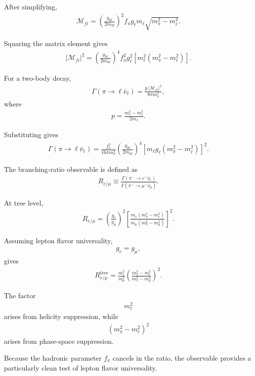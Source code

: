 After simplifying,
\begin{align}
\mathcal{M}_{fi}
=
\left(
\frac{g_W}{2m_W}
\right)^2
f_\pi g_\ell
m_\ell
\sqrt{m_\pi^2-m_\ell^2}.
\end{align}

Squaring the matrix element gives
\begin{align}
|\mathcal{M}_{fi}|^2
=
\left(
\frac{g_W}{2m_W}
\right)^4
f_\pi^2 g_\ell^2
\left[
m_\ell^2
(m_\pi^2-m_\ell^2)
\right].
\end{align}

For a two-body decay,
\begin{align}
\Gamma(\pi \to \ell \bar{\nu}_\ell)
=
\frac{
p\,|\mathcal{M}_{fi}|^2
}{
8\pi m_\pi^2
},
\end{align}
where
\begin{align}
p
=
\frac{
m_\pi^2-m_\ell^2
}{
2m_\pi
}.
\end{align}

Substituting gives
\begin{align}
\Gamma(\pi \to \ell \bar{\nu}_\ell)
=
\frac{f_\pi^2}{16\pi m_\pi^3}
\left(
\frac{g_W}{2m_W}
\right)^4
\left[
m_\ell g_\ell
(m_\pi^2-m_\ell^2)
\right]^2 .
\end{align}

The branching-ratio observable is defined as
\begin{align}
R_{e/\mu}
\equiv
\frac{
\Gamma(\pi^- \to e^- \bar{\nu}_e)
}{
\Gamma(\pi^- \to \mu^- \bar{\nu}_\mu)
}.
\end{align}

At tree level,
\begin{align}
R_{e/\mu}
=
\left(
\frac{g_e}{g_\mu}
\right)^2
\left[
\frac{
m_e(m_\pi^2-m_e^2)
}{
m_\mu(m_\pi^2-m_\mu^2)
}
\right]^2 .
\end{align}

Assuming lepton flavor universality,
\begin{align}
g_e = g_\mu ,
\end{align}
gives
\begin{align}
R_{e/\mu}^{\mathrm{tree}}
=
\frac{m_e^2}{m_\mu^2}
\left(
\frac{
m_\pi^2-m_e^2
}{
m_\pi^2-m_\mu^2
}
\right)^2 .
\end{align}

The factor
\begin{align}
m_\ell^2
\end{align}
arises from helicity suppression, while
\begin{align}
(m_\pi^2-m_\ell^2)^2
\end{align}
arises from phase-space suppression.

Because the hadronic parameter \(f_\pi\) cancels in the ratio, the observable provides a particularly clean test of lepton flavor universality.
